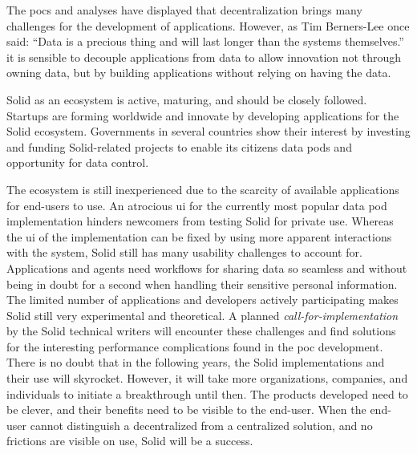 The \glspl{poc} and analyses have displayed that decentralization brings many challenges for the development of applications. However, as Tim Berners-Lee once said: “Data is a precious thing and will last longer than the systems themselves.” it is sensible to decouple applications from data to allow innovation not through owning data, but by building applications without relying on having the data.

\vspace{0.5cm}

Solid as an ecosystem is active, maturing, and should be closely followed. Startups are forming worldwide and innovate by developing applications for the Solid ecosystem. Governments in several countries show their interest by investing and funding Solid-related projects to enable its citizens data pods and opportunity for data control. 

The ecosystem is still inexperienced due to the scarcity of available applications for end-users to use. An atrocious \gls{ui} for the currently most popular data pod implementation hinders newcomers from testing Solid for private use. Whereas the \gls{ui} of the implementation can be fixed by using more apparent interactions with the system, Solid still has many usability challenges to account for. Applications and agents need workflows for sharing data so seamless and without being in doubt for a second when handling their sensitive personal information. The limited number of applications and developers actively participating makes Solid still very experimental and theoretical. A planned \textit{call-for-implementation} by the Solid technical writers will encounter these challenges and find solutions for the interesting performance complications found in the \gls{poc} development. There is no doubt that in the following years, the Solid implementations and their use will skyrocket. However, it will take more organizations, companies, and individuals to initiate a breakthrough until then. The products developed need to be clever, and their benefits need to be visible to the end-user. When the end-user cannot distinguish a decentralized from a centralized solution, and no frictions are visible on use, Solid will be a success.



